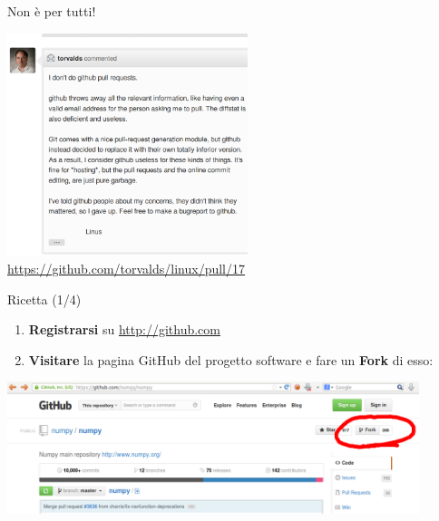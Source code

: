 \documentclass{beamer}
\begin{document}
\begin{frame}{\centerline{Non \`{e} per tutti!}}
\begin{center}
\includegraphics[width=7cm]{UniBo.IDSEPC.A2023.LavoroCondiviso/linus-on-pull-requests}
  \url{https://github.com/torvalds/linux/pull/17}
\end{center}
\end{frame}

\begin{frame}{\centerline{Ricetta (1/4)}}
  \begin{enumerate}
  \item \textbf{Registrarsi} su \url{http://github.com}
  \item \textbf{Visitare} la pagina GitHub del progetto software e fare un \textbf{Fork} di esso:
  \end{enumerate}
\begin{center}
\includegraphics[width=12cm]{UniBo.IDSEPC.A2023.LavoroCondiviso/github-fork}
\end{center}

\end{frame}
\end{document}
